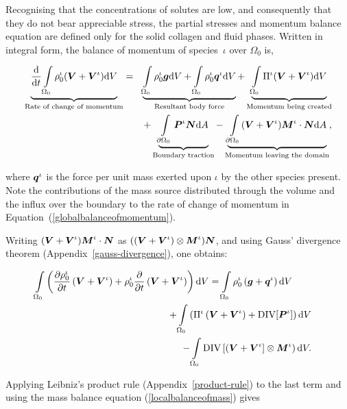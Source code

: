 Recognising that the concentrations of solutes are low, and
consequently that they do not bear appreciable stress, the partial
stresses and momentum balance equation are defined only for the solid
collagen and fluid phases. Written in integral form, the balance of
momentum of species~$\iota$ over $\Omega_0$ is,

\begin{eqnarray}
\underbrace{\frac{\mathrm{d}}{\mathrm{d}t} \int\limits_{\Omega_0}
  \rho_0^\iota(\mbox{\boldmath$ V$}+\mbox{\boldmath$ V$}^\iota) \mathrm{d}V}_{\text{Rate of change of
    momentum}} &=& \underbrace{\int\limits_{\Omega_0} \rho^\iota_0\mbox{\boldmath$ g$}
  \mathrm{d}V + \int\limits_{\Omega_0} \rho^\iota_0\mbox{\boldmath$ q$}^\iota
  \mathrm{d}V}_{\text{Resultant body force}} +
\underbrace{\int\limits_{\Omega_0} \Pi^\iota(\mbox{\boldmath$ V$}+\mbox{\boldmath$ V$}^\iota)
  \mathrm{d}V}_{\text{Momentum being created}} \nonumber\\ & &+
\underbrace{\int\limits_{\partial \Omega_0}\mbox{\boldmath$ P$}^\iota\mbox{\boldmath$ N$}
  \mathrm{d}A}_{\text{Boundary traction}} -
\underbrace{\int\limits_{\partial
    \Omega_0}(\mbox{\boldmath$ V$}+\mbox{\boldmath$ V$}^\iota)\mbox{\boldmath$ M$}^\iota\cdot\mbox{\boldmath$ N$}
  \mathrm{d}A}_{\text{Momentum leaving the domain}},
\label{globalbalanceofmomentum}
\end{eqnarray}

\noindent where $\mbox{\boldmath$ q$}^\iota$ is the force per unit mass exerted upon
$\iota$ by the other species present. Note the contributions of the
mass source distributed through the volume and the influx over the
boundary to the rate of change of momentum in
Equation~(\ref{globalbalanceofmomentum}).

Writing $(\mbox{\boldmath$ V$}+\mbox{\boldmath$ V$}^\iota) \mbox{\boldmath$ M$}^\iota\cdot\mbox{\boldmath$ N$}$ as
$((\mbox{\boldmath$ V$}+\mbox{\boldmath$ V$}^\iota)\otimes\mbox{\boldmath$ M$}^\iota)\mbox{\boldmath$ N$}$, and using Gauss' divergence
theorem (Appendix~\ref{gauss-divergence}), one obtains:

\begin{eqnarray}
\int\limits_{\Omega_0} \left(\frac{\partial\rho_0^\iota}{\partial
  t}\left(\mbox{\boldmath$ V$}+\mbox{\boldmath$ V$}^\iota\right) + \rho_0^\iota\frac{\partial}{\partial
  t}\left(\mbox{\boldmath$ V$}+\mbox{\boldmath$ V$}^\iota\right)\right) \mathrm{d}V =
\int\limits_{\Omega_0}\rho^\iota_0\left(\mbox{\boldmath$ g$}+\mbox{\boldmath$ q$}^\iota\right)
\mathrm{d}V \qquad&
&\nonumber\\ +\int\limits_{\Omega_0}\left(\Pi^\iota\left(\mbox{\boldmath$ V$}+\mbox{\boldmath$ V$}^\iota\right)
+ \mathrm{DIV}[\mbox{\boldmath$ P$}^\iota]\right) \mathrm{d}V& & \nonumber\\ -
\int\limits_{\Omega_0}\mathrm{DIV}
\left[\left(\mbox{\boldmath$ V$}+\mbox{\boldmath$ V$}^\iota\right]\otimes\mbox{\boldmath$ M$}^\iota\right)\mathrm{d}V .
\nonumber & &
\end{eqnarray}

\noindent Applying Leibniz's product rule
(Appendix~\ref{product-rule}) to the last term and using the mass
balance equation (\ref{localbalanceofmass}) gives

